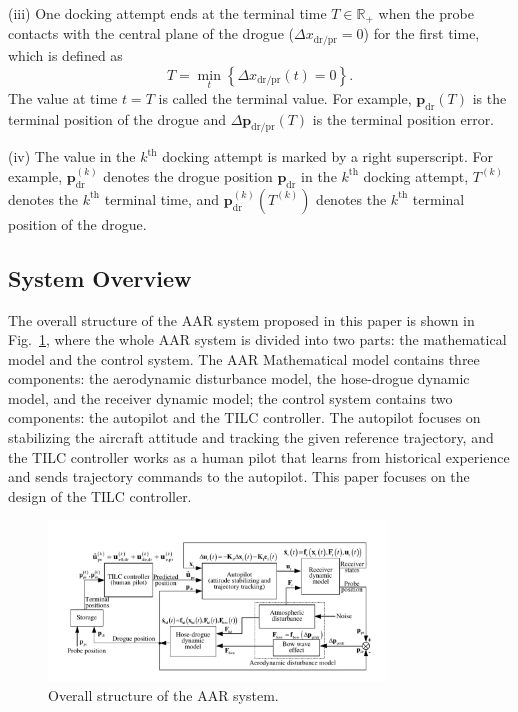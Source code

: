 (iii) One docking attempt ends at the terminal time $T\in%
\mathbb{R}%
_{+}$ when the probe contacts with the central plane of the drogue ($\Delta x_{\text{dr/pr}}=0$)
for the first time, which is defined as
\begin{equation}
T=\min_{t}\left\{ \Delta x_{\text{dr/pr}}\left(t\right)=0\right\} .\label{Eq-1-2}
\end{equation}
The value at time $t=T$ is called the terminal value. For example,
${\mathbf{p}}_{\text{dr}}\left(T\right)$ is the terminal position
of the drogue and $\Delta{\mathbf{p}}_{\text{dr/pr}}\left(T\right)$
is the terminal position error.

(iv) The value in the $k^{\text{th}}$ docking attempt is marked by
a right superscript. For example, ${\mathbf{p}}_{\text{dr}}^{\left(k\right)}$
denotes the drogue position ${\mathbf{p}}_{\text{dr}}$ in the $k^{\text{th}}$
docking attempt, $T^{\left(k\right)}$ denotes the $k^{\text{th}}$
terminal time, and ${\mathbf{p}}_{\text{dr}}^{\left(k\right)}\left(T^{\left(k\right)}\right)$
denotes the $k^{\text{th}}$ terminal position of the drogue.

\subsection{System Overview}

The overall structure of the AAR system proposed in this paper is
shown in Fig.~\ref{Fig-InnerCtrl}, where the whole AAR system is
divided into two parts: the mathematical model and the control system.
The AAR Mathematical model contains three components: the aerodynamic
disturbance model, the hose-drogue dynamic model, and the receiver
dynamic model; the control system contains two components: the autopilot
and the TILC controller. The autopilot focuses on stabilizing the
aircraft attitude and tracking the given reference trajectory, and
the TILC controller works as a human pilot that learns from historical
experience and sends trajectory commands to the autopilot. This paper
focuses on the design of the TILC controller. 

\begin{figure}[tbh]
	\centering \includegraphics[width=0.8\textwidth]{Figures/Figs_Ch9/InnerCtrl}
	\caption{Overall structure of the AAR system.}
	\label{Fig-InnerCtrl} 
\end{figure}

